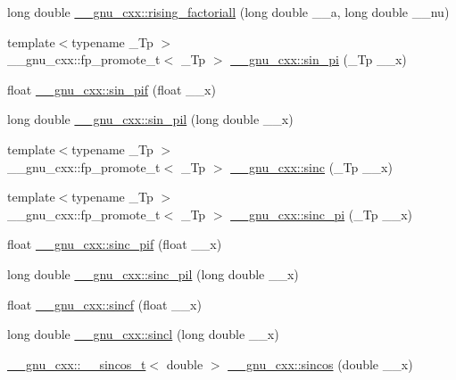 \begin{DoxyCompactItemize}
\item 
long double \hyperlink{group__mathsf__gnu_gac9a399ae01c315aa78a64b445795d974}{\+\_\+\+\_\+gnu\+\_\+cxx\+::rising\+\_\+factoriall} (long double \+\_\+\+\_\+a, long double \+\_\+\+\_\+nu)
\item 
{\footnotesize template$<$typename \+\_\+\+Tp $>$ }\\\+\_\+\+\_\+gnu\+\_\+cxx\+::fp\+\_\+promote\+\_\+t$<$ \+\_\+\+Tp $>$ \hyperlink{group__mathsf__gnu_ga220f8a9a0477697cff96e84dc911d5f0}{\+\_\+\+\_\+gnu\+\_\+cxx\+::sin\+\_\+pi} (\+\_\+\+Tp \+\_\+\+\_\+x)
\item 
float \hyperlink{group__mathsf__gnu_ga74fc8e2dd770850e7ea8bf8a28a71777}{\+\_\+\+\_\+gnu\+\_\+cxx\+::sin\+\_\+pif} (float \+\_\+\+\_\+x)
\item 
long double \hyperlink{group__mathsf__gnu_ga0bda860961b0a121e266b278f260634b}{\+\_\+\+\_\+gnu\+\_\+cxx\+::sin\+\_\+pil} (long double \+\_\+\+\_\+x)
\item 
{\footnotesize template$<$typename \+\_\+\+Tp $>$ }\\\+\_\+\+\_\+gnu\+\_\+cxx\+::fp\+\_\+promote\+\_\+t$<$ \+\_\+\+Tp $>$ \hyperlink{group__mathsf__gnu_ga09976b5d041113979c93613cc3700348}{\+\_\+\+\_\+gnu\+\_\+cxx\+::sinc} (\+\_\+\+Tp \+\_\+\+\_\+x)
\item 
{\footnotesize template$<$typename \+\_\+\+Tp $>$ }\\\+\_\+\+\_\+gnu\+\_\+cxx\+::fp\+\_\+promote\+\_\+t$<$ \+\_\+\+Tp $>$ \hyperlink{group__mathsf__gnu_ga5195270024403b985e7d4f2f935f8779}{\+\_\+\+\_\+gnu\+\_\+cxx\+::sinc\+\_\+pi} (\+\_\+\+Tp \+\_\+\+\_\+x)
\item 
float \hyperlink{group__mathsf__gnu_gad92d43d5332c80d1a27c90bfe3f6417e}{\+\_\+\+\_\+gnu\+\_\+cxx\+::sinc\+\_\+pif} (float \+\_\+\+\_\+x)
\item 
long double \hyperlink{group__mathsf__gnu_gaad38a6e40b1272391a26dbb32a684b3c}{\+\_\+\+\_\+gnu\+\_\+cxx\+::sinc\+\_\+pil} (long double \+\_\+\+\_\+x)
\item 
float \hyperlink{group__mathsf__gnu_gaa87f0734cfe7823c932511ac2f0a876c}{\+\_\+\+\_\+gnu\+\_\+cxx\+::sincf} (float \+\_\+\+\_\+x)
\item 
long double \hyperlink{group__mathsf__gnu_ga79a8fd931f5ad4f737e2931e636149ac}{\+\_\+\+\_\+gnu\+\_\+cxx\+::sincl} (long double \+\_\+\+\_\+x)
\item 
\hyperlink{struct____gnu__cxx_1_1____sincos__t}{\+\_\+\+\_\+gnu\+\_\+cxx\+::\+\_\+\+\_\+sincos\+\_\+t}$<$ double $>$ \hyperlink{group__mathsf__gnu_ga8041c24b528475bcf8a4178e484652a3}{\+\_\+\+\_\+gnu\+\_\+cxx\+::sincos} (double \+\_\+\+\_\+x)

\end{DoxyCompactItemize}

